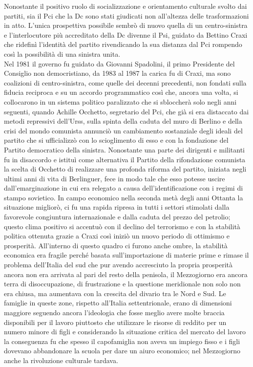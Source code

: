 Nonostante il positivo ruolo di socializzazione e orientamento culturale svolto dai partiti, sia il Pci che la Dc sono stati giudicati non all'altezza delle trasformazioni in atto.
L'unica prospettiva possibile sembrò di nuovo quella di un centro-sinistra e l'interlocutore più accreditato della Dc divenne il Psi, guidato da Bettino Craxi che ridefinì l'identità del partito rivendicando la sua distanza dal Pci rompendo così la possibilità di una sinistra unita.
\\Nel 1981 il governo fu guidato da Giovanni Spadolini, il primo Presidente del Consiglio non democristiano, da 1983 al 1987 la carica fu di Craxi, ma sono coalizioni di centro-sinistra, come quelle dei decenni precedenti, non fondati sulla fiducia reciproca e su un accordo programmatico così che, ancora una volta, si collocarono in un sistema politico paralizzato che si sbloccherà solo negli anni seguenti, quando Achille Occhetto, segretario del Pci, che già si era distaccato dai metodi repressivi dell'Urss, sulla spinta della caduta del muro di Berlino e della crisi del mondo comunista annunciò un cambiamento sostanziale degli ideali del partito che si ufficializzò con lo scioglimento di esso e con la fondazione del Partito democratico della sinistra.
Nonostante una parte dei dirigenti e militanti fu in disaccordo e istituì come alternativa il Partito della rifondazione comunista la scelta di Occhetto di realizzare una profonda riforma del partito, iniziata negli ultimi anni di vita di Berlinguer, fece in modo tale che esso potesse uscire dall'emarginazione in cui era relegato a causa dell'identificazione con i regimi di stampo sovietico.
In campo economico nella seconda metà degli anni Ottanta la situazione migliorò, ci fu una rapida ripresa in tutti i settori stimolati dalla favorevole congiuntura internazionale e dalla caduta del prezzo del petrolio; questo clima positivo si accentuò con il declino del terrorismo e con la stabilità politica ottenuta grazie a Craxi così iniziò un nuovo periodo di ottimismo e prosperità.
All'interno di questo quadro ci furono anche ombre, la stabilità economica era fragile perché basata sull'importazione di materie prime e rimase il problema dell'Italia del sud che pur avendo accresciuto la propria prosperità ancora non era arrivata al pari del resto della penisola, il Mezzogiorno era ancora terra di disoccupazione, di frustrazione e la questione meridionale non solo non era chiusa, ma aumentava con la crescita del divario tra le Nord e Sud.
Le famiglie in queste zone, rispetto all'Italia settentrionale, erano di dimensioni maggiore seguendo ancora l'ideologia che fosse meglio avere molte braccia disponibili per il lavoro piuttosto che utilizzare le risorse di reddito per un numero minore di figli e considerando la situazione critica del mercato del lavoro la conseguenza fu che spesso il capofamiglia non aveva un impiego fisso e i figli dovevano abbandonare la scuola per dare un aiuro economico; nel Mezzogiorno anche la rivoluzione culturale tardava.
